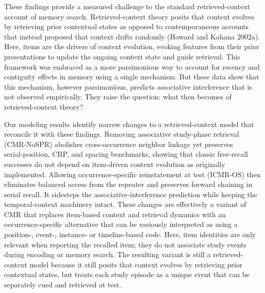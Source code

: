 \documentclass[
  letterpaper,
  11pt,
  english,
  singlespacing,
  headsepline]{MastersDoctoralThesis}
\begin{document}
These findings provide a measured challenge to the standard
retrieved-context account of memory search. Retrieved-context theory
posits that context evolves by retrieving prior contextual states as
opposed to contemporaneous accounts that instead proposed that context
drifts randomly (Howard and Kahana 2002a). Here, items are the drivers
of context evolution, evoking features from their prior presentations to
update the ongoing context state and guide retrieval. This framework was
embraced as a more parsimonious way to account for recency and
contiguity effects in memory using a single mechanism. But these data
show that this mechanism, however parsimonious, predicts associative
interference that is not observed empirically. They raise the question:
what then becomes of retrieved-context theory?

Our modeling results identify narrow changes to a retrieved-context
model that reconcile it with these findings. Removing associative
study-phase retrieval (CMR‑NoSPR) abolishes cross‑occurrence neighbor
linkage yet preserves serial‑position, CRP, and spacing benchmarks,
showing that classic free‑recall successes do not depend on item-driven
context evolution as originally implemented. Allowing
occurrence‑specific reinstatement at test (ICMR‑OS) then eliminates
balanced access from the repeater and preserves forward chaining in
serial recall. It sidesteps the associative‑interference prediction
while keeping the temporal‑context machinery intact. These changes are
effectively a variant of CMR that replaces item-based context and
retrieval dynamics with an occurrence-specific alternative that can be
variously interpreted as using a position-, event-, instance- or
timeline-based code. Here, item identities are only relevant when
reporting the recalled item; they do not associate study events during
encoding or memory search. The resulting variant is still a
retrieved-context model because it still posits that context evolves by
retrieving prior contextual states, but treats each study episode as a
unique event that can be separately cued and retrieved at test.
\end{document}
